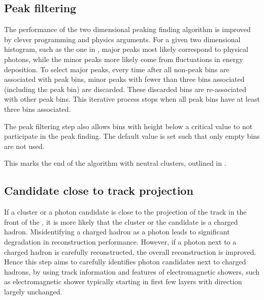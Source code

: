 
\subsection{Peak filtering}

The performance of the two dimensional peaking finding algorithm is improved by clever programming and physics arguments. For a given two dimensional histogram, such as the one in , major peaks most likely correspond to physical photons, while the minor peaks more likely come from fluctuations in energy deposition. To select major peaks, every time after all non-peak bins are associated with peak bins, minor peaks with fewer than three bins associated (including the peak bin) are discarded. These discarded bins are re-associated with other peak bins. This iterative process stops when all peak bins have at least three bins associated.

The peak filtering step also allows bins with height below a critical value to not participate in the peak finding. The default value is set such that only empty bins are not used.

This marks the end of the \PhotonReconstruction algorithm with neutral clusters, outlined in .

\subsection{Candidate close to track projection}
\label{sec:photon2Dtrack}
If a cluster or a photon candidate is close to the projection of the track in the front of the \ECAL, it is more likely that the cluster or the candidate is a charged hadron. Misidentifying a charged hadron as a photon leads to significant degradation in reconstruction performance. However, if a photon next to a charged hadron is carefully reconstructed, the overall reconstruction is improved. Hence this step aims to carefully identifies photon candidates next to charged hadrons, by using track information and features of electromagnetic showers, such as electromagnetic shower typically starting in first few layers with direction largely unchanged.

